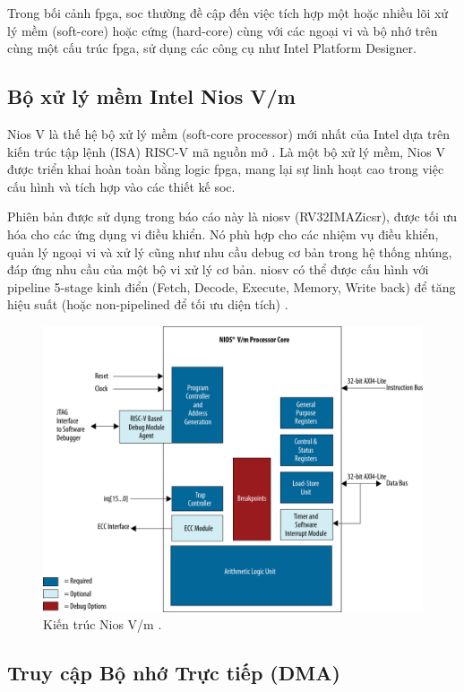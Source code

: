 Trong bối cảnh \acrshort{fpga}, \acrshort{soc} thường đề cập đến việc tích hợp một hoặc nhiều lõi xử lý mềm (soft-core) hoặc cứng (hard-core) cùng với các ngoại vi và bộ nhớ trên cùng một cấu trúc \acrshort{fpga}, sử dụng các công cụ như Intel Platform Designer.

\subsection{Bộ xử lý mềm Intel Nios V/m}
Nios V là thế hệ bộ xử lý mềm (soft-core processor) mới nhất của Intel dựa trên kiến trúc tập lệnh (ISA) RISC-V mã nguồn mở \cite{intelNiosVHandbook, niosv-reference-manual, altera_nios_v_2024}. Là một bộ xử lý mềm, Nios V được triển khai hoàn toàn bằng logic \acrshort{fpga}, mang lại sự linh hoạt cao trong việc cấu hình và tích hợp vào các thiết kế \acrshort{soc}.

Phiên bản được sử dụng trong báo cáo này là \acrlong{niosv} (RV32IMAZicsr), được tối ưu hóa cho các ứng dụng vi điều khiển. Nó phù hợp cho các nhiệm vụ điều khiển, quản lý ngoại vi và xử lý cũng như nhu cầu debug cơ bản trong hệ thống nhúng, đáp ứng nhu cầu của một bộ vi xử lý cơ bản. \acrlong{niosv} có thể được cấu hình với pipeline 5-stage kinh điển (Fetch, Decode, Execute, Memory, Write back) để tăng hiệu suất (hoặc non-pipelined để tối ưu diện tích) \cite{niosv-reference-manual}.
    
\begin{figure}[htbp]
    \centering
    \includegraphics[width=0.8\linewidth]{Images/02_00_NiosVm_Architecture.pdf}
    \caption{Kiến trúc Nios V/m \cite{niosv-reference-manual}.}
    \label{fig:02_00_NiosVm_Architecture}
\end{figure}

\subsection{Truy cập Bộ nhớ Trực tiếp (DMA)}

